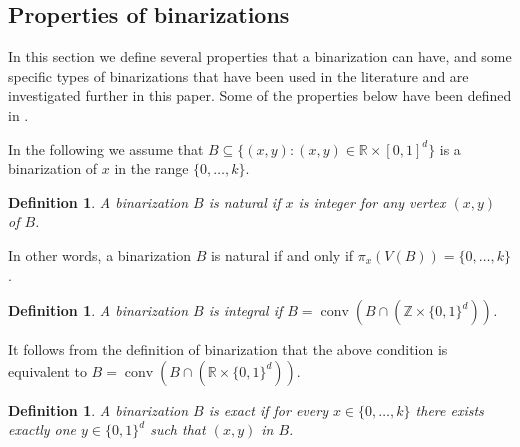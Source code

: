 \documentclass[11pt,a4paper]{article}
\newtheorem{definition}[theorem]{Definition}
\newcommand{\R}{\mathbb{R}}
\newcommand{\conv}{\operatorname{conv}}
\newcommand{\Z}{\mathbb{Z}}
\newcommand{\1}{\textbf{1}}
\newcommand\manuel[1]{\textcolor{LimeGreen}{\textbf{ MA:  #1}}}
\newcommand\marco[1]{\textcolor{red}{\textbf{ MDS:  #1}}}
\begin{document}





\subsection{Properties of binarizations}\label{sec:properties}
In this section we define several properties that a binarization can have, and some specific types of binarizations that have been used in the literature and are investigated further in this paper. Some of the properties below have been defined in \cite{dash2018binary}.

In the following we assume that $B\subseteq\{(x,y):(x,y)\in\R\times[0,1]^d\}$ is a binarization of $x$ in the range $\{0,\dots,k\}$.

\begin{definition}\label{def:natural}
A binarization $B$  is \emph{natural} if $x$ is integer for any vertex $(x,y)$ of $B$.  
\end{definition}

In other words, a binarization $B$ is natural if and only if $\pi_x(V(B))=\{0,\dots,k\}$. 

\begin{definition}
A binarization $B$ is \emph{integral} if $B=\conv(B\cap (\Z\times \{0,1\}^d))$.
\end{definition}

It follows from the definition of binarization that the above condition is equivalent to $B=\conv(B\cap (\R\times \{0,1\}^d))$.




\begin{definition}
A binarization $B$ is \emph{exact} if for every $x\in \{0,\dots,k\}$ there exists exactly one $y\in \{0,1\}^d$ such that  $(x,y)$ in $B$.
\end{definition}
\end{document}
